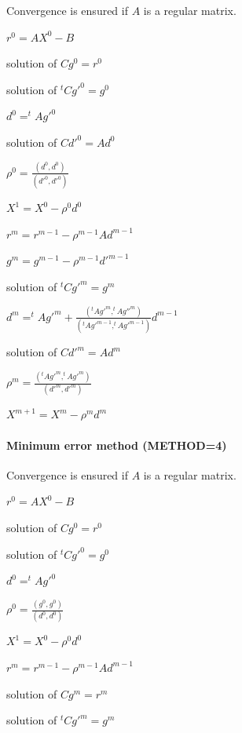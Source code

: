 Convergence is ensured if $A$ is a regular matrix.


$r^{0}  =  A X^{0} - B$

solution of $Cg^{0}  =  r^{0}$

solution of $ ^{t}Cg'^{0} = g^{0}$

$d^{0}  =   ^{t}A g'^{0}$

solution of $Cd'^{0}  =  Ad^{0}$

$\rho ^{0} = \frac{(d^{0},d^{0})}{(d'^{0},d'^{0})}$

$X^{1} = X^{0}  -  \rho ^{0} d^{0}$


$r^{m}  =  r^{m-1}  -  \rho ^{m-1} A d^{m-1}$

$g^{m}  =  g^{m-1}  -  \rho ^{m-1} d'^{m-1}$

solution of $ ^{t}Cg'^{m} = g^{m}$

$d^{m} =  ^{t}Ag'^{m}
        + \frac{( ^{t}Ag'^{m}, ^{t}Ag''^{m})}
               {( ^{t}Ag'^{m-1}, ^{t}Ag'^{m-1})} d^{m-1}$

solution of $Cd'^{m}  =  Ad^{m}$

$\rho ^{m} = \frac{( ^{t}Ag'^{m}, ^{t}Ag'^{m})}{(d'^{m},d'^{m})}$

$X^{m+1}  =  X^{m}  -  \rho ^{m} d^{m}$

\paragraph{Minimum error method (METHOD=4)}

Convergence is ensured if $A$ is a regular matrix.


$r^{0}  =  A X^{0} - B$

solution of $Cg^{0}  =  r^{0}$

solution of $ ^{t}Cg'^{0}  =  g^{0}$

$d^{0}  =  ^{t}A g'^{0}$

$\rho ^{0} = \frac{(g^{0},g^{0})}{(d^{0},d^{0})}$

$X^{1}  =  X^{0}  -  \rho ^{0} d^{0}$


$r^{m}  =  r^{m-1}  -  \rho ^{m-1} A d^{m-1}$

solution of $Cg^{m}  =  r^{m}$

solution of $ ^{t}Cg'^{m}  =  g^{m}$

